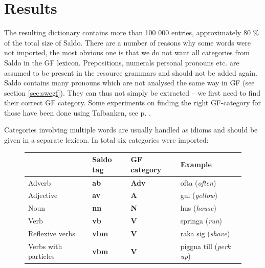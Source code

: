 \documentclass{report}
\begin{document}


\section{Results}
\label{sec:saldoRes}
The resulting dictionary contains more than 100 000 entries, approximately 80 \% 
of the total size of Saldo.
There are a number of reasons why some words were not imported,
the most obvious one is that we do not want all categories from
Saldo in the GF lexicon. Prepositions, %
numerals %
personal pronouns etc.
are assumed to be present in the resource grammars and should not be added again.
Saldo contains many pronouns which
are not analysed the same way in GF (see section \ref{sec:swegf}).
They can thus not simply be extracted -- we first need to find their correct GF category.
Some experiments on finding
the right GF-category for those have been done using Talbanken, see p. \pageref{sec:gf.quant}.

Categories involving multiple words %
are usually handled as idioms and should be given in a separate lexicon. In
total six categories were imported: \\

\begin{figure}[h]
\begin{tabular}{|l|lll|}
\hline
& Saldo tag & GF category & Example \\
\hline
 Adverb & \textbf{ab} &\textbf{Adv} & ofta (\emph{often})\\
 Adjective&\textbf{av} &    \textbf{A} & gul (\emph{yellow})\\
 Noun & \textbf{nn} &\textbf{N} & hus (\emph{house})\\
 Verb & \textbf{vb} &\textbf{V} & springa (\emph{run})\\
 Reflexive verbs  &\textbf{vbm}& \textbf{V} & raka sig (\emph{shave})\\
 Verbs with particles &\textbf{vbm}& \textbf{V}  &  piggna till (\emph{perk up})\\
\hline
\end{tabular}
\caption{}
\end{figure}
\end{document}

